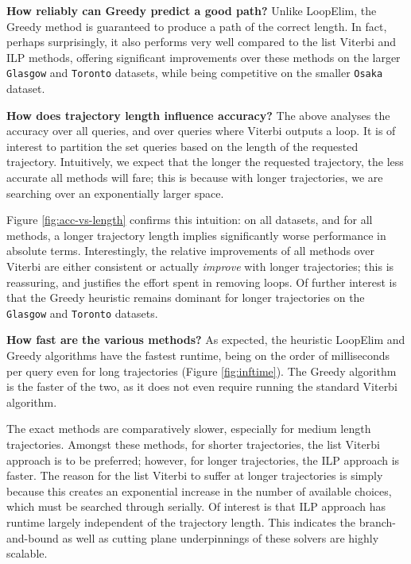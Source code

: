 
\textbf{How reliably can {\sc Greedy} predict a good path?}
Unlike {\sc LoopElim}, the {\sc Greedy} method is guaranteed to produce a path of the correct length.
In fact, perhaps surprisingly, it also performs very well compared to the list Viterbi and ILP methods, 
offering significant improvements over these methods on the larger {\tt Glasgow} and {\tt Toronto} datasets,
while being competitive on the smaller {\tt Osaka} dataset.


\textbf{How does trajectory length influence accuracy?}
The above analyses the accuracy over all queries, and over queries where {\sc Viterbi} outputs a loop.
It is of interest to partition the set queries based on the length of the requested trajectory.
Intuitively, we expect that the longer the requested trajectory, the less accurate all methods will fare; this is because with longer trajectories, we are searching over an exponentially larger space.

Figure \ref{fig:acc-vs-length} confirms this intuition:
on all datasets, and for all methods,
a longer trajectory length implies significantly worse performance in absolute terms.
Interestingly, the relative improvements of all methods over {\sc Viterbi} are either consistent or actually \emph{improve} with longer trajectories;
this is reassuring, and justifies the effort spent in removing loops.
Of further interest is that the {\sc Greedy} heuristic remains dominant for longer trajectories on the {\tt Glasgow} and {\tt Toronto} datasets.


\textbf{How fast are the various methods?}
As expected, the heuristic {\sc LoopElim} and {\sc Greedy} algorithms have the fastest runtime, being on the order of milliseconds per query even for long trajectories (Figure \ref{fig:inftime}).
The {\sc Greedy} algorithm is the faster of the two, as it does not even require running the standard Viterbi algorithm.

The exact methods are comparatively slower, especially for medium length trajectories.
Amongst these methods, for shorter trajectories, the list Viterbi approach is to be preferred;
however, for longer trajectories, the ILP approach is faster.
The reason for the list Viterbi to suffer at longer trajectories is simply because this creates an exponential increase in the number of available choices, which must be searched through serially.
Of interest is that ILP approach has runtime largely independent of the trajectory length.
This indicates the branch-and-bound as well as cutting plane underpinnings of these solvers are highly scalable.


